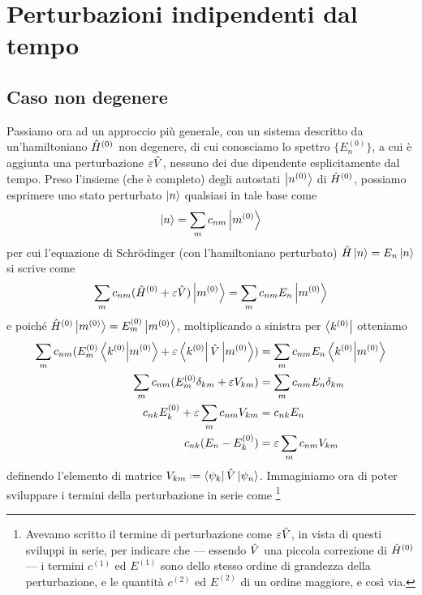 \section{Perturbazioni indipendenti dal tempo}
\subsection{Caso non degenere}
Passiamo ora ad un approccio più generale, con un sistema descritto da un'hamiltoniano $\hat{H}^{(0)}$ non degenere, di cui conosciamo lo spettro $\{E^{(0)}_n\}$, a cui è aggiunta una perturbazione $\varepsilon\hat{V}$, nessuno dei due dipendente esplicitamente dal tempo.
Preso l'insieme (che è completo) degli autostati $\left|{n^{(0)}}\right\rangle$ di $\hat{H}^{(0)}$, possiamo esprimere uno stato perturbato $\left|{n}\right\rangle$ qualsiasi in tale base come
\begin{equation}
	\left|{n}\right\rangle=\sum_mc_{nm}\left|{m^{(0)}}\right\rangle
	\label{eq:perturbazione-autostati-non-degeneri}
\end{equation}
per cui l'equazione di Schr\"odinger (con l'hamiltoniano perturbato) $\hat{H}\left|{n}\right\rangle=E_n\left|{n}\right\rangle$ si scrive come
\begin{equation}
	\sum_mc_{nm}(\hat{H}^{(0)}+\varepsilon\hat{V})\left|{m^{(0)}}\right\rangle=\sum_mc_{nm}E_n\left|{m^{(0)}}\right\rangle
\end{equation}
e poich\'e $\hat{H}^{(0)}\left|{m^{(0)}}\right\rangle=E^{(0)}_m\left|{m^{(0)}}\right\rangle$, moltiplicando a sinistra per $\left\langle{k^{(0)}}\right|$ otteniamo
\begin{equation}
	\begin{aligned}
		\sum_mc_{nm}(E^{(0)}_m\left\langle{k^{(0)}}\middle|{m^{(0)}}\right\rangle+\varepsilon\left\langle{k^{(0)}}\right|\hat{V}\left|{m^{(0)}}\right\rangle)&=\sum_mc_{nm}E_n\left\langle{k^{(0)}}\middle|{m^{(0)}}\right\rangle\\
		\sum_mc_{nm}(E^{(0)}_m\delta_{km}+\varepsilon V_{km})&=\sum_mc_{nm}E_n\delta_{km}\\
		c_{nk}E^{(0)}_k+\varepsilon\sum_mc_{nm}V_{km}&=c_{nk}E_n\\
		c_{nk}(E_n-E^{(0)}_k)&=\varepsilon\sum_mc_{nm}V_{km}
	\end{aligned}
	\label{eq:perturbazione-non-degenere}
\end{equation}
definendo l'elemento di matrice $V_{km}\defeq\bra{\psi_k}\op V\ket{\psi_n}$.
Immaginiamo ora di poter sviluppare i termini della perturbazione in serie come
\footnote{
	Avevamo scritto il termine di perturbazione come $\varepsilon\hat{V}$, in vista di questi sviluppi in serie, per indicare che --- essendo $\hat{V}$ una piccola correzione di $\hat{H}^{(0)}$ --- i termini $c^{(1)}$ ed $E^{(1)}$ sono dello stesso ordine di grandezza della perturbazione, e le quantità $c^{(2)}$ ed $E^{(2)}$ di un ordine maggiore, e cos\`i via.
}
